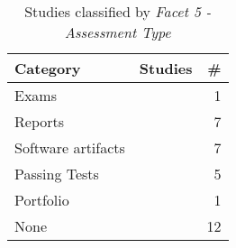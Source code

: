 
\begin{table}[htb]
	\centering
	\caption{Studies classified by \it Facet 5 - Assessment Type }
		{\begin{tabular}{l|l|r}
			\bf Category  & \bf Studies  & \bf \#  \\
			\hline
			Exams & \citep{id5546} & 1 \\
			Reports & \citep{id17882, id5343, id4815, id5676, id17805, id17845, id5335} & 7 \\
			Software artifacts & \citep{id5353, id0093, id1088, id4503, id4663, id5329, id0089}  & 7 \\
			Passing Tests & \citep{id0135, id0115, id0134, id0106, id1192} & 5 \\
			Portfolio & \citep{id4811} & 1 \\
			None & \citep{id17796,id5357, id17830, id18433, id17800, id0098, id1097, id1193, id4966, id5147,id18359, id5328} & 12 \\
		\end{tabular}}
	\label{tab:assessmentTypeStudies}
\end{table}
